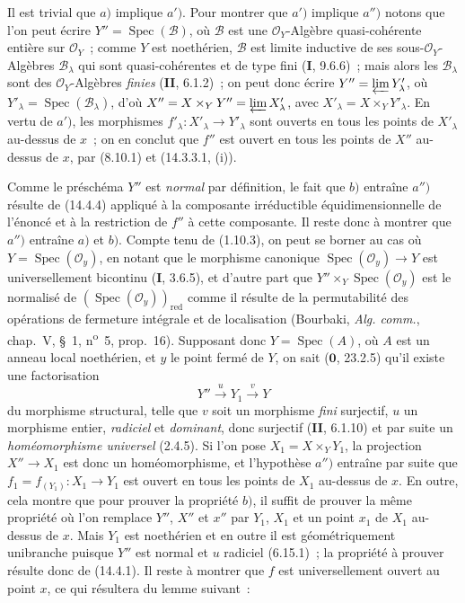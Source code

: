 Il est trivial que $a)$ implique $a')$. Pour montrer que $a')$ implique $a'')$
notons que l'on peut écrire $Y''=\operatorname{Spec}(\mathcal B)$, où $\mathcal B$
est une $\mathcal O_Y$-Algèbre quasi-cohérente entière sur $\mathcal O_Y$~; comme
$Y$ est noethérien, $\mathcal B$ est limite inductive de ses sous-$\mathcal O_Y$-%
Algèbres $\mathcal B_\lambda$ qui sont quasi-cohérentes et de type fini (\textbf{I}, 9.6.6)~;
mais alors les $\mathcal B_\lambda$ sont des $\mathcal O_Y$-Algèbres \emph{finies}
(\textbf{II}, 6.1.2)~; on peut donc écrire
$Y''=\varprojlim Y'_\lambda$, où
$Y'_\lambda=\operatorname{Spec}(\mathcal B_\lambda)$, d'où
$X''=X\times_Y Y''=\varprojlim X'_\lambda$, avec
$X'_\lambda=X\times_Y Y'_\lambda$. En vertu de $a')$, les morphismes
$f'_\lambda:X'_\lambda\to Y'_\lambda$ sont ouverts en tous les points de
$X'_\lambda$ au-dessus de $x$~; on en conclut que $f''$ est ouvert en tous les
points de $X''$ au-dessus de $x$, par (8.10.1) et (14.3.3.1, (i)).

Comme le préschéma $Y''$ est \emph{normal} par définition, le fait que $b)$ entraîne
$a'')$ résulte de (14.4.4) appliqué à la composante irréductible
équidimensionnelle de l'énoncé et à la restriction de $f''$ à cette composante. Il
reste donc à montrer que $a'')$ entraîne $a)$ et $b)$. Compte tenu de (1.10.3), on
peut se borner au cas où $Y=\operatorname{Spec}(\mathcal O_y)$, en notant que le
morphisme canonique $\operatorname{Spec}(\mathcal O_y)\to Y$ est universellement
bicontinu (\textbf{I}, 3.6.5), et d'autre part que
$Y''\times_Y\operatorname{Spec}(\mathcal O_y)$ est le normalisé de
$(\operatorname{Spec}(\mathcal O_y))_{\mathrm{red}}$ comme il résulte de la
permutabilité des opérations de fermeture intégrale et de localisation (Bourbaki,
\emph{Alg. comm.}, chap.~V, \S~1, n\textsuperscript{o}~5, prop.~16). Supposant donc
$Y=\operatorname{Spec}(A)$, où $A$ est un anneau local noethérien, et $y$ le point
fermé de $Y$, on sait ($\mathbf{0}$, 23.2.5) qu'il existe une
factorisation
\[
  Y''\xrightarrow{u}Y_1\xrightarrow{v}Y
\]
du morphisme structural, telle que $v$ soit un morphisme \emph{fini} surjectif, $u$
un morphisme entier, \emph{radiciel} et \emph{dominant}, donc surjectif (\textbf{II},
6.1.10) et par suite un \emph{homéomorphisme universel} (2.4.5). Si l'on pose
$X_1=X\times_Y Y_1$, la projection $X''\to X_1$ est donc un homéomorphisme, et
l'hypothèse $a'')$ entraîne par suite que $f_1=f_{(Y_1)}:X_1\to Y_1$ est ouvert en
tous les points de $X_1$ au-dessus de $x$. En outre, cela montre que pour prouver
la propriété $b)$, il suffit de prouver la même propriété où l'on remplace $Y''$,
$X''$ et $x''$ par $Y_1$, $X_1$ et un point $x_1$ de $X_1$ au-dessus de $x$. Mais
$Y_1$ est noethérien et en outre il est géométriquement unibranche puisque $Y''$
est normal et $u$ radiciel (6.15.1)~; la propriété à prouver résulte donc de
(14.4.1). Il reste à montrer que $f$ est universellement ouvert au point $x$, ce
qui résultera du lemme suivant~:

